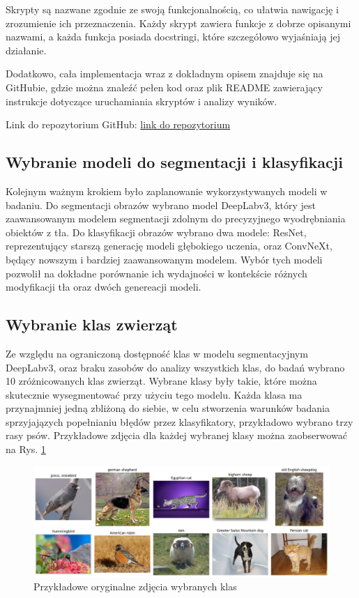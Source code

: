 Skrypty są nazwane zgodnie ze swoją funkcjonalnością, co ułatwia nawigację i zrozumienie ich przeznaczenia. Każdy skrypt zawiera funkcje z dobrze opisanymi nazwami, a każda funkcja posiada docstringi, które szczegółowo wyjaśniają jej działanie.

Dodatkowo, cała implementacja wraz z dokładnym opisem znajduje się na GitHubie, gdzie można znaleźć pełen kod oraz plik README zawierający instrukcje dotyczące uruchamiania skryptów i analizy wyników. 

Link do repozytorium GitHub: \href{https://github.com/paulpel/BackgroundImpactAnalysis}{link do repozytorium}

\subsection*{Wybranie modeli do segmentacji i klasyfikacji}

Kolejnym ważnym krokiem było zaplanowanie wykorzystywanych modeli w badaniu. Do segmentacji obrazów wybrano model DeepLabv3, który jest zaawansowanym modelem segmentacji zdolnym do precyzyjnego wyodrębniania obiektów z tła. 
Do klasyfikacji obrazów wybrano dwa modele: ResNet, reprezentujący starszą generację modeli głębokiego uczenia, oraz ConvNeXt, będący nowszym i bardziej zaawansowanym modelem. Wybór tych modeli pozwolił na dokładne porównanie ich wydajności 
w kontekście różnych modyfikacji tła oraz dwóch genereacji modeli.

\subsection*{Wybranie klas zwierząt}

Ze względu na ograniczoną dostępność klas w modelu segmentacyjnym DeepLabv3, oraz braku zasobów do analizy wszystkich klas, do badań wybrano 10 zróżnicowanych klas zwierząt. Wybrane klasy były takie, które można skutecznie wysegmentować przy 
użyciu tego modelu. Każda klasa ma przynajmniej jedną zbliżoną do siebie, w celu stworzenia warunków badania sprzyjajązych popełnianiu błędów przez klasyfikatory, przykładowo wybrano trzy rasy psów. Przykładowe zdjęcia dla każdej wybranej 
klasy można zaobserwować na Rys. \ref{rys:classes}

\begin{figure}
	\centering\includegraphics[width=.9\textwidth]{img/classes}
	\caption{Przykładowe oryginalne zdjęcia wybranych klas}  \label{rys:classes}
\end{figure}

